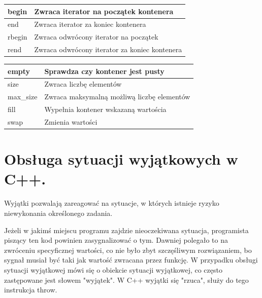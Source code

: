 \documentclass[12pt]{article}
\begin{document}
    \begin{table}[H]
        \begin{tabular}{|l|l|}
            \hline
            begin & Zwraca iterator na początek kontenera         \\ \hline
            end & Zwraca iterator za koniec kontenera           \\ \hline
            rbegin & Zwraca odwrócony iterator na początek         \\ \hline
            rend & Zwraca odwrócony iterator za koniec kontenera \\ \hline
        \end{tabular}
    \end{table}

    \begin{table}[H]
        \begin{tabular}{|l|l|}
            \hline
            empty & Sprawdza czy kontener jest pusty           \\ \hline
            size & Zwraca liczbę elementów                    \\ \hline
            max\_size & Zwraca maksymalną możliwą liczbę elementów \\ \hline
            fill & Wypełnia kontener wskazaną wartościa       \\ \hline
            swap & Zmienia wartości                           \\ \hline
        \end{tabular}
    \end{table}

    \newpage

    \section{Obsługa sytuacji wyjątkowych w C++.}

    Wyjątki pozwalają zareagować na sytuacje, w których istnieje ryzyko niewykonania określonego zadania.

    Jeżeli w jakimś miejscu programu zajdzie nieoczekiwana sytuacja, programista piszący ten kod powinien zasygnalizować o tym. Dawniej polegało to na zwróceniu specyficznej wartości, co nie było zbyt szczęśliwym rozwiązaniem, bo sygnał musiał być taki jak wartość zwracana przez funkcję. W przypadku obsługi sytuacji wyjątkowej mówi się o obiekcie sytuacji wyjątkowej, co często zastępowane jest słowem "wyjątek". W C++ wyjątki się "rzuca", służy do tego instrukcja throw.
\end{document}
